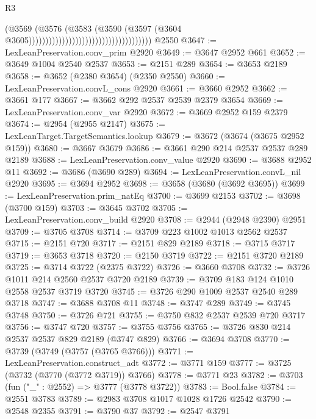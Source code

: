 \begin{lexlean}{R3}
\begin{coremodule}
                                                                  (@3569
                                                                    (@3576
                                                                      (@3583
                                                                        (@3590
                                                                          (@3597
                                                                            (@3604
                                                                              @3605)))))))))))))))))))))))))))))))))))))
    @2550
@3647 := LexLeanPreservation.conv_prim @2920
@3649 := @3647 @2952 @661
@3652 := @3649 @1004 @2540 @2537
@3653 := @2151 @289
@3654 := @3653 @2189
@3658 := @3652 (@2380 @3654) (@2350 @2550)
@3660 := LexLeanPreservation.convL_cons @2920
@3661 := @3660 @2952
@3662 := @3661 @177
@3667 := @3662 @292 @2537 @2539 @2379 @3654
@3669 := LexLeanPreservation.conv_var @2920
@3672 := @3669 @2952 @159 @2379
@3674 := @2954 (@2955 @2147)
@3675 := LexLeanTarget.TargetSemantics.lookup
@3679 := @3672 (@3674 (@3675 @2952 @159))
@3680 := @3667 @3679
@3686 := @3661 @290 @214 @2537 @2537 @289 @2189
@3688 := LexLeanPreservation.conv_value @2920
@3690 := @3688 @2952 @11
@3692 := @3686 (@3690 @289)
@3694 := LexLeanPreservation.convL_nil @2920
@3695 := @3694 @2952
@3698 := @3658 (@3680 (@3692 @3695))
@3699 := LexLeanPreservation.prim_natEq
@3700 := @3699 @2153
@3702 := @3698 (@3700 @159)
@3703 := @3645 @3702
@3705 := LexLeanPreservation.conv_build @2920
@3708 := @2944 (@2948 @2390) @2951
@3709 := @3705 @3708
@3714 := @3709 @223 @1002 @1013 @2562 @2537
@3715 := @2151 @720
@3717 := @2151 @829 @2189
@3718 := @3715 @3717
@3719 := @3653 @3718
@3720 := @2150 @3719
@3722 := @2151 @3720 @2189
@3725 := @3714 @3722 (@2375 @3722)
@3726 := @3660 @3708
@3732 := @3726 @1011 @214 @2560 @2537 @3720 @2189
@3739 := @3709 @183 @124 @1010 @2558 @2537 @3719 @3720
@3745 := @3726 @290 @1009 @2537 @2540 @289 @3718
@3747 := @3688 @3708 @11
@3748 := @3747 @289
@3749 := @3745 @3748
@3750 := @3726 @721
@3755 := @3750 @832 @2537 @2539 @720 @3717
@3756 := @3747 @720
@3757 := @3755 @3756
@3765 := @3726 @830 @214 @2537 @2537 @829 @2189 (@3747 @829)
@3766 := @3694 @3708
@3770 := @3739 (@3749 (@3757 (@3765 @3766)))
@3771 := LexLeanPreservation.construct_adt
@3772 := @3771 @159
@3777 := @3725 (@3732 (@3770 (@3772 @3719)) @3766)
@3778 := @3771 @23
@3782 := @3703 (fun ("_" : @2552) => @3777 (@3778 @3722))
@3783 := Bool.false
@3784 := @2551 @3783
@3789 := @2983 @3708 @1017 @1028 @1726 @2542
@3790 := @2548 @2355
@3791 := @3790 @37
@3792 := @2547 @3791

\end{coremodule}
\end{lexlean}
